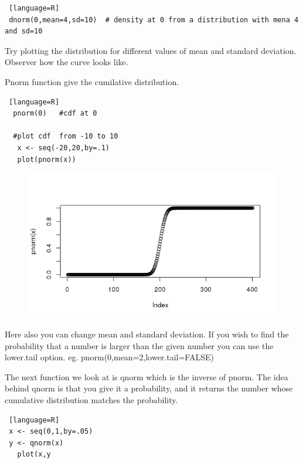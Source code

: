 \documentclass["../Applied_probabillity _and_statistics_lab_KTU.tex"]{subfiles}
\begin{document}
 \begin{lstlisting} [language=R]
 dnorm(0,mean=4,sd=10)  # density at 0 from a distribution with mena 4 and sd=10
 \end{lstlisting}

Try plotting the distribution for different values of mean and standard deviation. Observer how the curve looks like.

Pnorm function give the cumilative   distribution. 
 \begin{lstlisting} [language=R]
  pnorm(0)   #cdf at 0
  
  #plot cdf  from -10 to 10 
   x <- seq(-20,20,by=.1)
   plot(pnorm(x))

 \end{lstlisting}

\begin{figure}
 \includegraphics[scale=.4]{../images/normal_cdf}
 \label{norm}
 \end{figure} 
Here also you can change mean and standard deviation. If you wish to find the probability that a number is larger than the given number you can use the lower.tail option. eg.  pnorm(0,mean=2,lower.tail=FALSE)

The next function we look at is qnorm which is the inverse of pnorm. The idea behind qnorm is that you give it a probability, and it returns the number whose cumulative distribution matches the probability. 

\begin{lstlisting} [language=R]
 x <- seq(0,1,by=.05)
 y <- qnorm(x)
   plot(x,y
\end{lstlisting}
\end{document}
